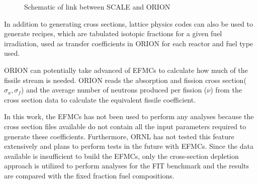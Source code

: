 \documentclass{article}
\begin{document}
 \begin{figure}[htbp!]
    \begin{center}
    \end{center}
    \caption{Schematic of link between SCALE and ORION}
    \label{fig:sch}
\end{figure}

In addition to generating cross sections, lattice physics codes can also be used to generate recipes, which are
tabulated isotopic fractions for a given fuel irradiation, used as transfer coefficients in ORION for each 
reactor and fuel type used. 


ORION  can potentially take advanced of \glspl{EFMC} to calculate how much of the fissile stream is needed. ORION reads
the absorption and fission cross section($\sigma_a, \sigma_f$) and the average number of neutrons produced per fission ($\nu$)
from the cross section data to calculate the equivalent fissile coefficient.

In this work, the \glspl{EFMC} has not been used to perform any analyses because the
cross section files available do not contain all the
input parameters required to generate these coefficients.
Furthermore, \gls{ORNL} has not tested this feature extensively and plans to perform tests
in the future with \glspl{EFMC}. Since the data available is insufficient to build the \glspl{EFMC}, only
the cross-section depletion approach is utilized to perform analyses for the \gls{FIT} benchmark and the results
are compared with the fixed fraction fuel compositions.
\end{document}
